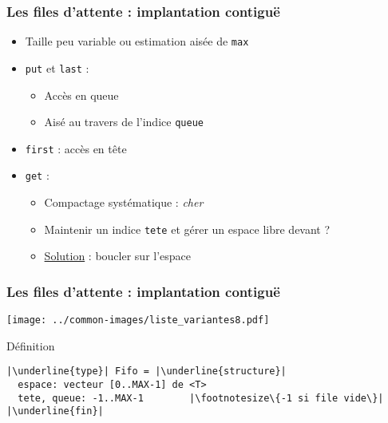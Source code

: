 \documentclass[table,handout,tikz,12pt,svgnames]{beamer}
\begin{document}
\begin{frame}[fragile=singleslide]
	\frametitle{Les files d'attente : implantation contiguë}
	\begin{block}{}
		\begin{itemize}
			\item Taille peu variable ou estimation aisée de \texttt{max}
			\item \texttt{put} et \texttt{last} :
			\begin{itemize}
				\item Accès en queue
				\item Aisé au travers de l'indice \texttt{queue}
			\end{itemize}
			\item \texttt{first} : accès en tête
			\item \texttt{get} :
			\begin{itemize}
				\item Compactage systématique : \textit{cher}
				\item Maintenir un indice \texttt{tete} et gérer un espace libre devant ?
				\item \underline{Solution} : boucler sur l'espace
			\end{itemize}
		\end{itemize}
	\end{block}
\end{frame}


\begin{frame}[fragile=singleslide]
	\frametitle{Les files d'attente : implantation contiguë}
	\begin{center}
		\hspace{-0.5cm}
		{\texttt{[image: ../common-images/liste\_variantes8.pdf]}}
	\end{center}
	\begin{block}{Définition}
		\begin{verbatim}
|\underline{type}| Fifo = |\underline{structure}|
  espace: vecteur [0..MAX-1] de <T>
  tete, queue: -1..MAX-1        |\footnotesize\{-1 si file vide\}|
|\underline{fin}|
		\end{verbatim}
	\end{block}
\end{frame}
\end{document}
